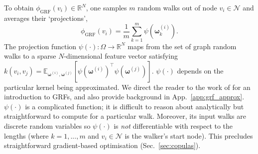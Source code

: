 To obtain $\phi_\textrm{GRF}(v_i) \in \mathbb{R}^N$, one samples $m$ random walks  out of node $v_i \in \mathcal{N}$ and averages their `projections', \vspace{0mm}
\begin{equation} \label{eq:projection_func}
    \phi_\textrm{GRF}(v_i) = \frac{1}{m} \sum_{k=1}^m \psi( \boldsymbol{\omega}_k^{(i)}).
\end{equation} 
The projection function $\psi(\cdot): \Omega \to \mathbb{R}^N$ maps from the set of graph random walks  to a sparse $N$-dimensional feature vector satisfying $k(v_i,v_j) = \mathbb{E}_{\boldsymbol{\omega}^{(i)}, \boldsymbol{\omega}^{(j)}}[\psi(\boldsymbol{\omega}^{(i)})^\top \psi(\boldsymbol{\omega}^{(j)})]$. 
$\psi(\cdot)$ depends on the particular kernel being approximated.
We direct the reader to the work of \citet{reid2023universal} for an introduction to GRFs, and also provide background in App.~\ref{app:grf_approx}. 
$\psi(\cdot)$ is a complicated function; it is difficult to reason about analytically but straightforward to compute for a particular walk. 
Moreover, its input walks are discrete random variables so $\psi(\cdot)$ is \emph{not} differentiable with respect to the lengths  (where $k=1,...,m$ and $v_i \in \mathcal{N}$ is the walker's start node).
This precludes straightforward gradient-based optimisation (Sec.~\ref{sec:copulas}). 

